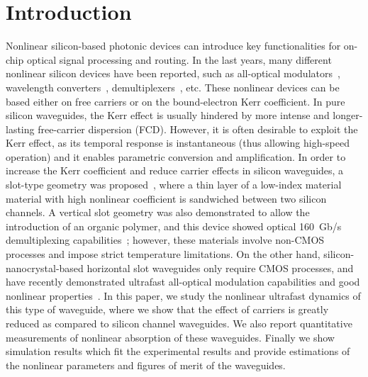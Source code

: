 \documentclass[10pt,letterpaper]{article}
\begin{document}
\section{Introduction}
Nonlinear silicon-based photonic devices can introduce key functionalities for on-chip optical signal processing and routing. In the last years, many different nonlinear silicon devices have been reported, such as all-optical modulators~\cite{Almeida2004a}, wavelength converters~\cite{Lee2009}, demultiplexers~\cite{Koos2009}, etc. These nonlinear devices can be based either on free carriers or on the bound-electron Kerr coefficient. In pure silicon waveguides, the Kerr effect is usually hindered by more intense and longer-lasting free-carrier dispersion (FCD). However, it is often desirable to exploit the Kerr effect, as its temporal response is instantaneous (thus allowing high-speed operation) and it enables parametric conversion and amplification. In order to increase the Kerr coefficient and reduce carrier effects in silicon waveguides, a slot-type geometry was proposed~\cite{Sanchis2007}, where a thin layer of a low-index material material with high nonlinear coefficient is sandwiched between two 
silicon channels. A vertical slot geometry was also demonstrated to allow the introduction of an organic polymer, and this device showed optical 160~Gb/s demultiplexing capabilities~\cite{Koos2009}; however, these materials involve non-CMOS processes and impose strict temperature limitations. On the other hand, silicon-nanocrystal-based horizontal slot waveguides only require CMOS processes, and have recently demonstrated ultrafast all-optical modulation capabilities and good nonlinear properties~\cite{Spano2009, Martinez2010a, Otona, Trita2011}. In this paper, we study the nonlinear ultrafast dynamics of this type of waveguide, where we show that the effect of carriers is greatly reduced as compared to silicon channel waveguides. We also report quantitative measurements of nonlinear absorption of these waveguides. Finally we show simulation results which fit the experimental results and provide estimations of the nonlinear parameters and figures of merit of the waveguides.
\end{document}
